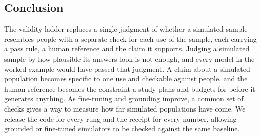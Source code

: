 \subsection*{Conclusion}

The validity ladder replaces a single judgment of whether a simulated sample resembles people with a separate check for each use of the sample, each carrying a pass rule, a human reference and the claim it supports.
Judging a simulated sample by how plausible its answers look is not enough, and every model in the worked example would have passed that judgment.
A claim about a simulated population becomes specific to one use and checkable against people, and the human reference becomes the constraint a study plans and budgets for before it generates anything.
As fine-tuning and grounding improve, a common set of checks gives a way to measure how far simulated populations have come.
We release the code for every rung and the receipt for every number, allowing grounded or fine-tuned simulators to be checked against the same baseline.
